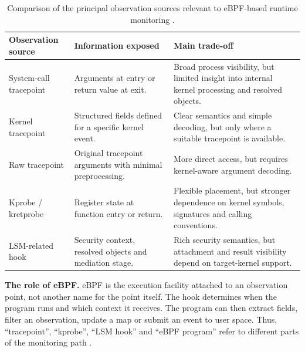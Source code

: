 \begin{table}[H]
    \centering
    \footnotesize
    \setlength{\tabcolsep}{5pt}
    \renewcommand{\arraystretch}{1.18}
    \label{tab:kernel-observation-sources}

    \begin{tabularx}{\textwidth}{
        @{}
        >{\raggedright\arraybackslash}p{}
        >{\raggedright\arraybackslash}p{}
        >{\raggedright\arraybackslash}X
        @{}
    }
        \toprule
        \textbf{Observation source} &
        \textbf{Information exposed} &
        \textbf{Main trade-off} \\
        \midrule

        System-call tracepoint &
        Arguments at entry or return value at exit. &
        Broad process visibility, but limited insight into internal kernel
        processing and resolved objects. \\

        Kernel tracepoint &
        Structured fields defined for a specific kernel event. &
        Clear semantics and simple decoding, but only where a suitable
        tracepoint is available. \\

        Raw tracepoint &
        Original tracepoint arguments with minimal preprocessing. &
        More direct access, but requires kernel-aware argument decoding. \\

        Kprobe / kretprobe &
        Register state at function entry or return. &
        Flexible placement, but stronger dependence on kernel symbols,
        signatures and calling conventions. \\

        LSM-related hook &
        Security context, resolved objects and mediation stage. &
        Rich security semantics, but attachment and result visibility depend
        on target-kernel support. \\

        \bottomrule
    \end{tabularx}
    \caption[Observation sources for eBPF runtime monitoring]
    {Comparison of the principal observation sources relevant to
    eBPF-based runtime monitoring
    \cite{linux_tracepoints,linux_kprobes,linux_lsm_development,
    linux_libbpf_program_types}.}
\end{table}

\medskip
\noindent\textbf{The role of eBPF.}
eBPF is the execution facility attached to an observation point, not another
name for the point itself. The hook determines when the program runs and which
context it receives. The program can then extract fields, filter an observation,
update a map or submit an event to user space. Thus, ``tracepoint'', ``kprobe'',
``LSM hook'' and ``eBPF program'' refer to different parts of the monitoring
path \cite{linux2024ebpfuserspaceapi,linux_libbpf_program_types}.

